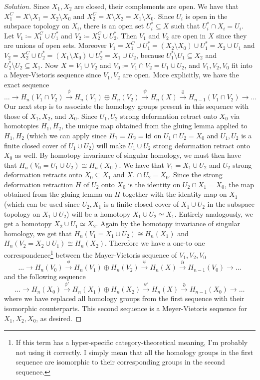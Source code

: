 \begin{proof}[Solution]
Since $X_1, X_2$ are closed, their complements are open. We have that $X_1^C = X \setminus X_1 = X_2\setminus X_0$ and $X_2^C = X \setminus X_2 = X_1\setminus X_0$. Since $U_i$ is open in the subspace topology on $X_i$, there is an open set $U_i^* \subseteq X$ such that $U_i^* \cap X_i = U_i$. Let $V_1 \coloneqq X_1^C \cup U_1^*$ and $V_2 \coloneqq  X_2^C \cup U_2^*$. Then $V_1$ and $V_2$ are open in $X$ since they are unions of open sets. Moreover $V_1 = X_1^C \cup U_1^* = (X_2 \setminus X_0) \cup U_1^* = X_2 \cup U_1$ and $V_2 = X_2^C \cup U_2^* = (X_1 \setminus X_0) \cup U_2^* = X_1 \cup U_2$, because $U_1^* \setminus U_1 \subseteq X_2$ and $U_2^* \setminus U_2 \subseteq X_1$. Now $X = V_1 \cup V_2$ and $V_0 \coloneqq V_1 \cap V_2 = U_1 \cup U_2$, and $V_1, V_2, V_0$ fit into a Meyer-Vietoris sequence since $V_1, V_2$ are open. More explicitly, we have the exact sequence
\[
\ldots \to H_n(V_1 \cap V_2) \overset{\phi}{\to} H_n(V_1) \oplus H_n(V_2) \overset{\psi}{\to} H_n(X) \overset{\partial}{\to} H_{n-1}(V_1 \cap V_2) \to \ldots
\]
Our next step is to associate the homology groups present in this sequence with those of $X_1, X_2$, and $X_0$. Since $U_1, U_2$ strong deformation retract onto $X_0$ via homotopies $H_1, H_2$, the unique map obtained from the gluing lemma applied to $H_1, H_2$ (which we can apply since $H_1 = H_2 = \mathsf{Id}$ on $U_1 \cap U_2 = X_0$ and $U_1, U_2$ is a finite closed cover of $U_1 \cup U_2$) will make $U_1\cup U_2$ strong deformation retract onto $X_0$ as well. By homotopy invariance of singular homology, we must then have that $H_n(V_0 = U_1 \cup U_2) \cong H_n(X_0)$. We have that $V_1 = X_1 \cup U_2$ and $U_2$ strong deformation retracts onto $X_0 \subseteq X_1$ and $X_1 \cap U_2 = X_0$. Since the strong deformation retraction $H$ of $U_2$ onto $X_0$ is the identity on $U_2 \cap X_1 = X_0$, the map obtained from the gluing lemma on $H$ together with the identity map on $X_1$ (which can be used since $U_2, X_1$ is a finite closed cover of $X_1 \cup U_2$ in the subspace topology on $X_1\cup U_2$) will be a homotopy $X_1 \cup U_2 \simeq X_1$. Entirely analogously, we get a homotopy $X_2 \cup U_1 \simeq X_2$. Again by the homotopy invariance of singular homology, we get that $H_n(V_1 = X_1 \cup U_2) \cong H_n(X_1)$ and $H_n(V_2 = X_2 \cup U_1) \cong H_n(X_2)$. Therefore we have a one-to one correspondence\footnote{If this term has a hyper-specific category-theoretical meaning, I'm probably not using it correctly. I simply mean that all the homology groups in the first sequence are isomorphic to their corresponding groups in the second sequence.}  between the Mayer-Vietoris sequence of $V_1, V_2, V_0$
\[
\ldots \to H_n(V_0) \overset{\phi}{\to} H_n(V_1) \oplus H_n(V_2) \overset{\psi}{\to} H_n(X) \overset{\partial}{\to} H_{n-1}(V_0) \to \ldots
\]
and the following sequence
\[
\ldots \to H_n(X_0) \overset{\phi'}{\to} H_n(X_1) \oplus H_n(X_2) \overset{\psi'}{\to} H_n(X) \overset{\partial}{\to} H_{n-1}(X_0) \to \ldots
\]
where we have replaced all homology groups from the first sequence with their isomorphic counterparts. This second sequence is a Meyer-Vietoris sequence for $X_1, X_2, X_0$, as desired.
\end{proof}


